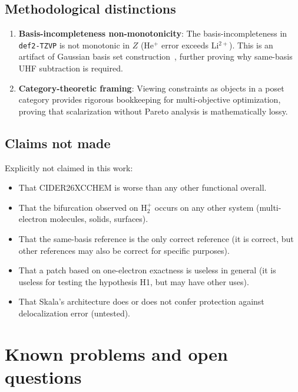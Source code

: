 \documentclass[11pt]{report}
\theoremstyle{definition}
\theoremstyle{remark}
\begin{document}
\section{Methodological distinctions}

\begin{enumerate}
  \item \textbf{Basis-incompleteness non-monotonicity}: The basis-incompleteness
        in \texttt{def2-TZVP} is not monotonic in $Z$ (He$^+$ error exceeds Li$^{2+}$).
        This is an artifact of Gaussian basis set construction~\cite{Weigend2005},
        further proving why same-basis UHF subtraction is required.
  \item \textbf{Category-theoretic framing}: Viewing constraints as objects in a
        poset category provides rigorous bookkeeping for multi-objective optimization,
        proving that scalarization without Pareto analysis is mathematically lossy.
\end{enumerate}

\section{Claims not made}

Explicitly not claimed in this work:

\begin{itemize}
  \item That CIDER26XCCHEM is worse than any other functional overall.
  \item That the bifurcation observed on H$_2^+$ occurs on any other
        system (multi-electron molecules, solids, surfaces).
  \item That the same-basis reference is the only correct reference
        (it is correct, but other references may also be correct for
        specific purposes).
  \item That a patch based on one-electron exactness is useless in
        general (it is useless for testing the hypothesis H1, but may
        have other uses).
  \item That Skala's architecture does or does not confer protection
        against delocalization error (untested).
\end{itemize}

\chapter{Known problems and open questions}
\label{ch:issues}
\end{document}
